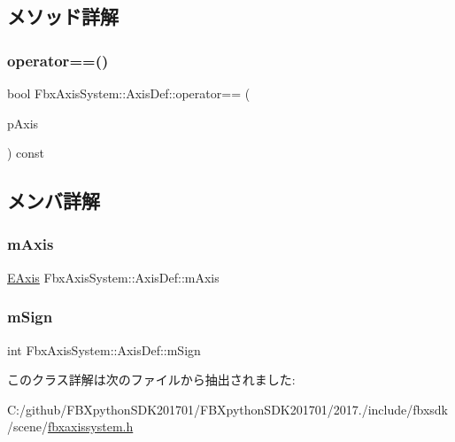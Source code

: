 \subsection{メソッド詳解}
\mbox{\label{class_fbx_axis_system_1_1_axis_def_a97686e930af5f9528fbe2777f503f547}} 
\subsubsection{\texorpdfstring{operator==()}{operator==()}}
{\footnotesize\ttfamily bool Fbx\+Axis\+System\+::\+Axis\+Def\+::operator== (\begin{DoxyParamCaption}\item[{const \hyperlink{class_fbx_axis_system_1_1_axis_def}{Axis\+Def} \&}]{p\+Axis }\end{DoxyParamCaption}) const}



\subsection{メンバ詳解}
\mbox{\label{class_fbx_axis_system_1_1_axis_def_a5e631800d928b1d20b545ceb94f7b6b2}} 
\subsubsection{\texorpdfstring{m\+Axis}{mAxis}}
{\footnotesize\ttfamily \hyperlink{class_fbx_axis_system_1_1_axis_def_acd082d83d7eff8dad168cf508d30eb54}{E\+Axis} Fbx\+Axis\+System\+::\+Axis\+Def\+::m\+Axis}

\mbox{\label{class_fbx_axis_system_1_1_axis_def_a3d7254aed9f2e6a7ffa2b30e7234dbc0}} 
\subsubsection{\texorpdfstring{m\+Sign}{mSign}}
{\footnotesize\ttfamily int Fbx\+Axis\+System\+::\+Axis\+Def\+::m\+Sign}



このクラス詳解は次のファイルから抽出されました\+:\begin{DoxyCompactItemize}
\item 
C\+:/github/\+F\+B\+Xpython\+S\+D\+K201701/\+F\+B\+Xpython\+S\+D\+K201701/2017./include/fbxsdk/scene/\hyperlink{fbxaxissystem_8h}{fbxaxissystem.\+h}\end{DoxyCompactItemize}
